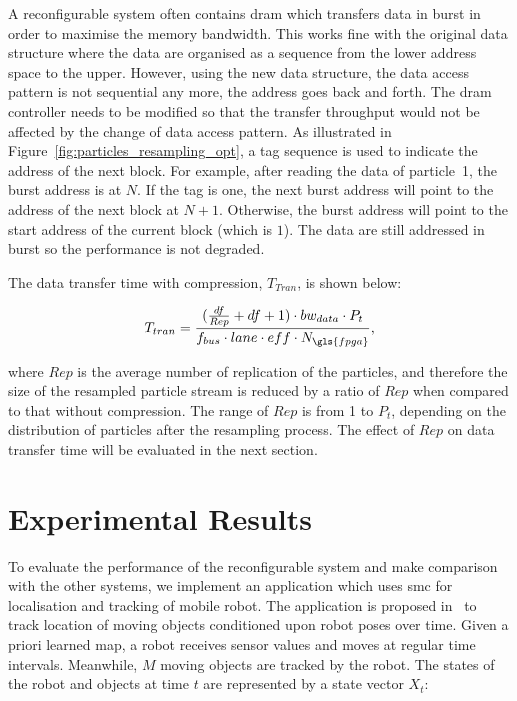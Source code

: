A reconfigurable system often contains \gls{dram} which transfers data in burst in order to maximise the memory bandwidth.
This works fine with the original data structure where the data are organised as a sequence from the lower address space to the upper.
However, using the new data structure, the data access pattern is not sequential any more, the address goes back and forth.
The \gls{dram} controller needs to be modified so that the transfer throughput would not be affected by the change of data access pattern.
As illustrated in Figure~\ref{fig:particles_resampling_opt}, a tag sequence is used to indicate the address of the next block.
For example, after reading the data of particle~1, the burst address is at $N$.
If the tag is one, the next burst address will point to the address of the next block at $N+1$.
Otherwise, the burst address will point to the start address of the current block (which is $1$).
The data are still addressed in burst so the performance is not degraded.

The data transfer time with compression, $T_{Tran}$, is shown below:

\begin{equation}
\begin{aligned}
T_{tran} = \frac{(\frac{df}{Rep} + df + 1) \cdot bw_{data} \cdot P_t}{f_{bus} \cdot lane \cdot eff \cdot N_{\gls{fpga}}} \mbox{,}
\end{aligned}
\label{eqt:data_opt}
\end{equation}

where $Rep$ is the average number of replication of the particles,
and therefore the size of the resampled particle stream is reduced by a ratio of $Rep$ when compared to that without compression.
The range of $Rep$ is from 1 to $P_t$, depending on the distribution of particles after the resampling process.
The effect of $Rep$ on data transfer time will be evaluated in the next section.

\section{Experimental Results}
\label{sec:reconfig_results}

To evaluate the performance of the reconfigurable system and make comparison with the other systems, 
we implement an application which uses \gls{smc} for localisation and tracking of mobile robot.
The application is proposed in~\cite{montemerlo02} to track location of moving objects conditioned upon robot poses over time.
Given a priori learned map, a robot receives sensor values and moves at regular time intervals. 
Meanwhile, $M$ moving objects are tracked by the robot.
The states of the robot and objects at time $t$ are represented by a state vector $X_t$:
 
